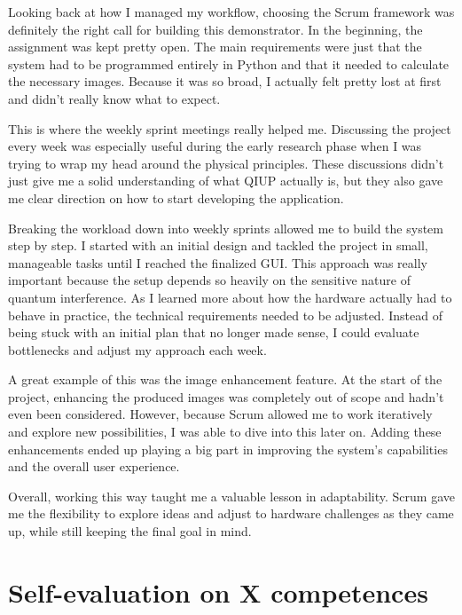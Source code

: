 \documentclass[12pt,a4paper]{article}
\begin{document}
Looking back at how I managed my workflow, choosing the Scrum framework was definitely the right call for building this demonstrator. In the beginning, the assignment was kept pretty open. The main requirements were just that the system had to be programmed entirely in Python and that it needed to calculate the necessary images. Because it was so broad, I actually felt pretty lost at first and didn’t really know what to expect.

This is where the weekly sprint meetings really helped me. Discussing the project every week was especially useful during the early research phase when I was trying to wrap my head around the physical principles. These discussions didn't just give me a solid understanding of what QIUP actually is, but they also gave me clear direction on how to start developing the application.

Breaking the workload down into weekly sprints allowed me to build the system step by step. I started with an initial design and tackled the project in small, manageable tasks until I reached the finalized GUI. This approach was really important because the setup depends so heavily on the sensitive nature of quantum interference. As I learned more about how the hardware actually had to behave in practice, the technical requirements needed to be adjusted. Instead of being stuck with an initial plan that no longer made sense, I could evaluate bottlenecks and adjust my approach each week.

A great example of this was the image enhancement feature. At the start of the project, enhancing the produced images was completely out of scope and hadn't even been considered. However, because Scrum allowed me to work iteratively and explore new possibilities, I was able to dive into this later on. Adding these enhancements ended up playing a big part in improving the system's capabilities and the overall user experience.

Overall, working this way taught me a valuable lesson in adaptability. Scrum gave me the flexibility to explore ideas and adjust to hardware challenges as they came up, while still keeping the final goal in mind.

\newpage
\section{Self-evaluation on X competences}
\end{document}
